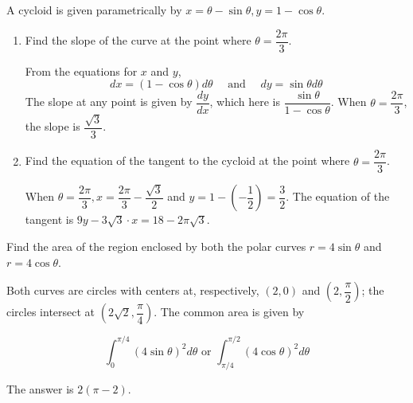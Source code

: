 \question
A cycloid is given parametrically by $x=\theta-\sin \theta, y=1-\cos \theta$.
\begin{enumerate}
\renewcommand{\labelenumi}{(\alph{enumi})}
\item Find the slope of the curve at the point where $\theta=\dfrac{2 \pi}{3}$.
\begin{solutionorbox}[1.5in]
From the equations for $x$ and $y$,
\[
d x=(1-\cos \theta) d \theta \quad \text { and } \quad d y=\sin \theta d \theta
\]
The slope at any point is given by $\dfrac{d y}{d x}$, which here is $\dfrac{\sin \theta}{1-\cos \theta}$. When $\theta=\dfrac{2 \pi}{3}$, the slope is $\dfrac{\sqrt{3}}{3}$.
\end{solutionorbox}
\item Find the equation of the tangent to the cycloid at the point where $\theta=\dfrac{2 \pi}{3}$.
\begin{solutionorbox}[1.5in]
When $\theta=\dfrac{2 \pi}{3}, x=\dfrac{2 \pi}{3}-\dfrac{\sqrt{3}}{2}$ and $y=1-\left(-\dfrac{1}{2}\right)=\dfrac{3}{2}$. The equation of the tangent is $9 y-3 \sqrt{3} \cdot x=18-2 \pi \sqrt{3}$.
\end{solutionorbox}
\end{enumerate}






\newpage




\question
Find the area of the region enclosed by both the polar curves $r=4 \sin \theta$ and $r=4 \cos \theta$.\\
\begin{solutionorbox}[1.5in]
Both curves are circles with centers at, respectively, $(2,0)$ and $\left(2, \dfrac{\pi}{2}\right)$; the circles intersect at $\left(2 \sqrt{2}, \dfrac{\pi}{4}\right)$. The common area is given by

\[
\int_{0}^{\pi / 4}(4 \sin \theta)^{2} d \theta \text { or } \int_{\pi / 4}^{\pi / 2}(4 \cos \theta)^{2} d \theta
\]

The answer is $2(\pi-2)$.
\end{solutionorbox}


